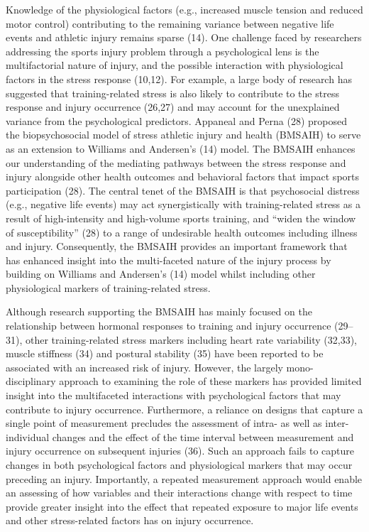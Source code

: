\documentclass[
  english,
  man]{apa6}
\begin{document}
Knowledge of the physiological factors (e.g., increased muscle tension and reduced motor control) contributing to the remaining variance between negative life events and athletic injury remains sparse (14). One challenge faced by researchers addressing the sports injury problem through a psychological lens is the multifactorial nature of injury, and the possible interaction with physiological factors in the stress response (10,12). For example, a large body of research has suggested that training-related stress is also likely to contribute to the stress response and injury occurrence (26,27) and may account for the unexplained variance from the psychological predictors. Appaneal and Perna (28) proposed the biopsychosocial model of stress athletic injury and health (BMSAIH) to serve as an extension to Williams and Andersen's (14) model. The BMSAIH enhances our understanding of the mediating pathways between the stress response and injury alongside other health outcomes and behavioral factors that impact sports participation (28). The central tenet of the BMSAIH is that psychosocial distress (e.g., negative life events) may act synergistically with training-related stress as a result of high-intensity and high-volume sports training, and ``widen the window of susceptibility'' (28) to a range of undesirable health outcomes including illness and injury. Consequently, the BMSAIH provides an important framework that has enhanced insight into the multi-faceted nature of the injury process by building on Williams and Andersen's (14) model whilst including other physiological markers of training-related stress.

Although research supporting the BMSAIH has mainly focused on the relationship between hormonal responses to training and injury occurrence (29--31), other training-related stress markers including heart rate variability (32,33), muscle stiffness (34) and postural stability (35) have been reported to be associated with an increased risk of injury. However, the largely mono-disciplinary approach to examining the role of these markers has provided limited insight into the multifaceted interactions with psychological factors that may contribute to injury occurrence.
Furthermore, a reliance on designs that capture a single point of measurement precludes the assessment of intra- as well as inter-individual changes and the effect of the time interval between measurement and injury occurrence on subsequent injuries (36). Such an approach fails to capture changes in both psychological factors and physiological markers that may occur preceding an injury.
Importantly, a repeated measurement approach would enable an assessing of how variables and their interactions change with respect to time provide greater insight into the effect that repeated exposure to major life events and other stress-related factors has on injury occurrence.
\end{document}
